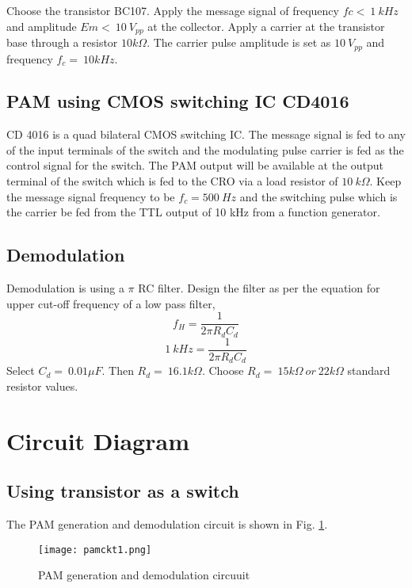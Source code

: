 \noindent Choose the transistor BC107.
\noindent Apply the message signal of frequency $fc < \ 1 \ kHz$ and amplitude $Em<\ 10\ V_{pp}$ at the collector.
\noindent Apply a carrier at the transistor base through a resistor $10 k\Omega$. The carrier pulse amplitude is set as $10 \ V_{pp}$ and frequency $f_c=\ 10 kHz$.

\subsection*{PAM using CMOS switching IC CD4016}
CD 4016 is a quad bilateral CMOS switching IC. The message signal is fed to any of the input terminals of the switch and the modulating pulse carrier is fed as the control signal for the switch. The PAM output will be available at the output terminal of the switch which is fed to the CRO via a load resistor of $10\ k\Omega$. Keep the message signal frequency to be $f_c=500 \ Hz$ and the switching pulse which is the carrier  be fed  from the TTL output of 10 kHz from a function generator.

\subsection*{Demodulation}
Demodulation is using a  $\pi$ RC filter.
\noindent Design the filter as per the equation for upper cut-off frequency of a low pass filter,
\begin{equation}
f_H=\frac{1}{2\pi R_dC_d}
\end{equation}
\begin{equation}
1\ kHz=\frac{1}{2\pi R_dC_d}
\end{equation}
\noindent Select $C_d=\ 0.01 \mu F$. Then $R_d=\ 16.1k\Omega$.
Choose $R_d=\ 15k\Omega \ or\ 22k\Omega$ standard resistor values.\\
\section*{Circuit Diagram}
\subsection*{Using transistor as a switch}



The PAM generation and demodulation circuit is shown in Fig. \ref{pamckt}.

\begin{figure}
\texttt{[image: pamckt1.png]}
\caption{PAM generation and demodulation circuuit}
\label{pamckt}
\end{figure}



